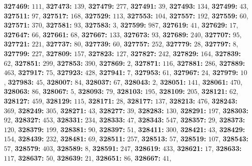 \textsf{\bfseries 327469:} $111$, \textsf{\bfseries 327473:} $139$, \textsf{\bfseries 327479:} $277$, \textsf{\bfseries 327491:} $39$, \textsf{\bfseries 327493:} $134$, \textsf{\bfseries 327499:} $43$, \textsf{\bfseries 327511:} $97$, \textsf{\bfseries 327517:} $168$, \textsf{\bfseries 327529:} $113$, \textsf{\bfseries 327553:} $104$, \textsf{\bfseries 327557:} $192$, \textsf{\bfseries 327559:} $60$, \textsf{\bfseries 327571:} $370$, \textsf{\bfseries 327581:} $93$, \textsf{\bfseries 327583:} $3$, \textsf{\bfseries 327599:} $987$, \textsf{\bfseries 327619:} $41$, \textsf{\bfseries 327629:} $17$, \textsf{\bfseries 327647:} $66$, \textsf{\bfseries 327661:} $68$, \textsf{\bfseries 327667:} $133$, \textsf{\bfseries 327673:} $93$, \textsf{\bfseries 327689:} $240$, \textsf{\bfseries 327707:} $95$, \textsf{\bfseries 327721:} $221$, \textsf{\bfseries 327737:} $80$, \textsf{\bfseries 327739:} $60$, \textsf{\bfseries 327757:} $252$, \textsf{\bfseries 327779:} $28$, \textsf{\bfseries 327797:} $8$, \textsf{\bfseries 327799:} $227$, \textsf{\bfseries 327809:} $157$, \textsf{\bfseries 327823:} $127$, \textsf{\bfseries 327827:} $242$, \textsf{\bfseries 327829:} $164$, \textsf{\bfseries 327839:} $62$, \textsf{\bfseries 327851:} $299$, \textsf{\bfseries 327853:} $390$, \textsf{\bfseries 327869:} $2$, \textsf{\bfseries 327871:} $116$, \textsf{\bfseries 327881:} $286$, \textsf{\bfseries 327889:} $463$, \textsf{\bfseries 327917:} $75$, \textsf{\bfseries 327923:} $428$, \textsf{\bfseries 327941:} $7$, \textsf{\bfseries 327953:} $61$, \textsf{\bfseries 327967:} $24$, \textsf{\bfseries 327979:} $10$, \textsf{\bfseries 327983:} $45$, \textsf{\bfseries 328007:} $84$, \textsf{\bfseries 328037:} $67$, \textsf{\bfseries 328043:} $2$, \textsf{\bfseries 328051:} $141$, \textsf{\bfseries 328061:} $470$, \textsf{\bfseries 328063:} $86$, \textsf{\bfseries 328067:} $5$, \textsf{\bfseries 328093:} $79$, \textsf{\bfseries 328103:} $195$, \textsf{\bfseries 328109:} $205$, \textsf{\bfseries 328121:} $62$, \textsf{\bfseries 328127:} $459$, \textsf{\bfseries 328129:} $115$, \textsf{\bfseries 328171:} $28$, \textsf{\bfseries 328177:} $137$, \textsf{\bfseries 328213:} $476$, \textsf{\bfseries 328243:} $369$, \textsf{\bfseries 328249:} $305$, \textsf{\bfseries 328271:} $43$, \textsf{\bfseries 328277:} $39$, \textsf{\bfseries 328283:} $130$, \textsf{\bfseries 328291:} $197$, \textsf{\bfseries 328303:} $92$, \textsf{\bfseries 328327:} $453$, \textsf{\bfseries 328331:} $234$, \textsf{\bfseries 328333:} $47$, \textsf{\bfseries 328343:} $547$, \textsf{\bfseries 328357:} $29$, \textsf{\bfseries 328373:} $120$, \textsf{\bfseries 328379:} $199$, \textsf{\bfseries 328381:} $90$, \textsf{\bfseries 328397:} $51$, \textsf{\bfseries 328411:} $300$, \textsf{\bfseries 328421:} $43$, \textsf{\bfseries 328429:} $154$, \textsf{\bfseries 328439:} $232$, \textsf{\bfseries 328481:} $69$, \textsf{\bfseries 328511:} $257$, \textsf{\bfseries 328513:} $57$, \textsf{\bfseries 328519:} $107$, \textsf{\bfseries 328543:} $57$, \textsf{\bfseries 328579:} $403$, \textsf{\bfseries 328589:} $8$, \textsf{\bfseries 328591:} $247$, \textsf{\bfseries 328619:} $433$, \textsf{\bfseries 328621:} $17$, \textsf{\bfseries 328633:} $117$, \textsf{\bfseries 328637:} $50$, \textsf{\bfseries 328639:} $21$, \textsf{\bfseries 328651:} $86$, \textsf{\bfseries 328667:} $41$, 
